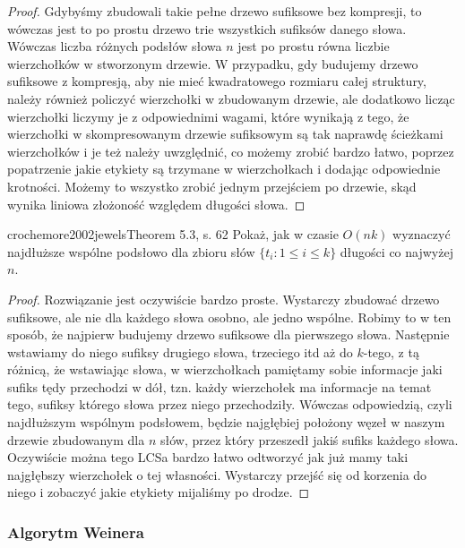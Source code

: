 \begin{proof}
Gdybyśmy zbudowali takie pełne drzewo sufiksowe bez kompresji, to wówczas jest to po prostu drzewo trie wszystkich sufiksów danego słowa. Wówczas liczba różnych podsłów słowa $n$ jest po prostu równa liczbie wierzchołków w stworzonym drzewie. W przypadku, gdy budujemy drzewo sufiksowe z kompresją, aby nie mieć kwadratowego rozmiaru całej struktury, należy również policzyć wierzchołki w zbudowanym drzewie, ale dodatkowo licząc wierzchołki liczymy je z odpowiednimi wagami, które wynikają z tego, że wierzchołki w skompresowanym drzewie sufiksowym są tak naprawdę ścieżkami wierzchołków i je też należy uwzględnić, co możemy zrobić bardzo łatwo, poprzez popatrzenie jakie etykiety są trzymane w wierzchołkach i dodając odpowiednie krotności. Możemy to wszystko zrobić jednym przejściem po drzewie, skąd wynika liniowa złożoność względem długości słowa.
\end{proof}

\begin{problem}{crochemore2002jewels}{Theorem 5.3, s. 62}
  Pokaż, jak w czasie $O(n k)$ wyznaczyć najdłuższe wspólne podsłowo dla zbioru słów $\{t_i: 1 \le i \le k\}$ długości co najwyżej $n$.
\end{problem}

\begin{proof}
Rozwiązanie jest oczywiście bardzo proste. Wystarczy zbudować drzewo sufiksowe, ale nie dla każdego słowa osobno, ale jedno wspólne. Robimy to w ten sposób, że najpierw budujemy drzewo sufiksowe dla pierwszego słowa. Następnie wstawiamy do niego sufiksy drugiego słowa, trzeciego itd aż do $k$-tego, z tą różnicą, że wstawiając słowa, w wierzchołkach pamiętamy sobie informacje jaki sufiks tędy przechodzi w dół, tzn. każdy wierzchołek ma informacje na temat tego, sufiksy którego słowa przez niego przechodziły. Wówczas odpowiedzią, czyli najdłuższym wspólnym podsłowem, będzie najgłębiej położony węzeł w naszym drzewie zbudowanym dla $n$ słów, przez który przeszedł jakiś sufiks każdego słowa. Oczywiście można tego LCSa bardzo łatwo odtworzyć jak już mamy taki najgłębszy wierzchołek o tej własności. Wystarczy przejść się od korzenia do niego i zobaczyć jakie etykiety mijaliśmy po drodze.
\end{proof}

\subsubsection{Algorytm Weinera}

